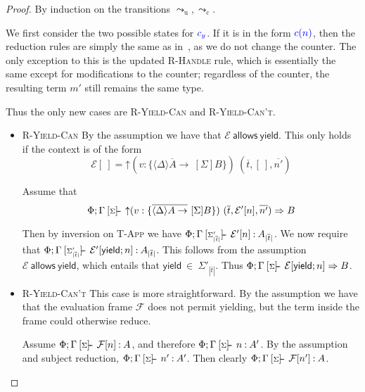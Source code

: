 \documentclass[msc,deptreport,cs]{infthesis} %
\newcommand{\counter}{{\color{blue}c_y}}
\newcommand{\justc}[1]{{\color{blue} c({#1})}}
\newcommand\allows{\textsf{allows}\xspace}
\newcommand\Cse{\textbf{Case}}
\newcommand{\many}{\overline}
\newcommand{\sigentails}[1]{\mathbin{[{\text{\scriptsize ${#1}$}}]\hspace{-0.4ex}\text{-\!-}}\,}
\newcommand{\inferbase}[5]{#1; #3 \mathbin{#2} {#4} \Rightarrow {#5}}
\newcommand{\checkbase}[5]{#1; #3 \mathbin{#2} #5 \mathbin{:} #4}
\newcommand{\makes}[5]{\inferbase{#1}{\sigentails{#3}}{#2}{#4}{#5}}
\newcommand{\has}[5]{\checkbase{#1}{\sigentails{#3}}{#2}{#4}{#5}}
\newcommand{\checksk}{\has{\kenv}}
\newcommand{\inferskgs}{\makes{\kenv}{\Gamma}{\sigs}}
\newcommand{\checkskgs}{\has{\kenv}{\Gamma}{\sigs}}
\newcommand{\adj}{\Delta}
\newcommand{\sigs}{\Sigma}
\newcommand{\thunk}[1]{\{{#1}\}}
\newcommand{\effin}[1]{\langle {#1} \rangle}
\newcommand{\effout}[1]{[{#1}]}
\newcommand{\EC}{\mathcal{E}}
\newcommand{\EF}{\mathcal{F}}
\newcommand{\cu}{\mathord{\uparrow}}
\newcommand{\redtou}{\leadsto_{\mathrm{u}}}
\newcommand{\redtoc}{\leadsto_{\mathrm{c}}}
\newcommand{\kenv}{\Phi}  %
\begin{document}
\begin{proof}
By induction on the transitions $\redtou, \redtoc$.

We first consider the two possible states for $\counter$. If it is in the form
$\justc{n}$, then the reduction rules are simply the same as
in~\cite{convent2020doo}, as we do not change the counter. The only exception to
this is the updated \textsc{R-Handle} rule, which is essentially the same except
for modifications to the counter; regardless of the counter, the resulting term
$m'$ still remains the same type.

Thus the only new cases are \textsc{R-Yield-Can} and \textsc{R-Yield-Can't}.

\begin{itemize}
\item[\Cse] \textsc{R-Yield-Can}
  By the assumption we have that $\EC~\allows~\textsf{yield}$. This only holds
  if the context is of the form
  \[\EC[~] = \cu (v : \thunk{\many{\effin{\adj} A
      \to}~\effout{\sigs}B})~(\many{t},[~],\many{n'})\]

  Assume that
  \[\inferskgs{\cu (v : \thunk{\many{\effin{\adj} A
      \to}~\effout{\sigs}B})~(\many{t},\EC'[n],\many{n'})}{B}\]

  Then by inversion on \textsc{T-App} we have
  $\checksk{\Gamma}{\sigs'_{|\many{t}|}}{A_{|\many{t}|}}{\EC'[n]}$. We now
  require that
  $\checksk{\Gamma}{\sigs'_{|\many{t}|}}{A_{|\many{t}|}}{\EC'[\textsf{yield};
      n]}$. This follows from the assumption $\EC~\allows~\textsf{yield}$, which
  entails that $\textsf{yield}~\in~\sigs'_{|\many{t}|}$. Thus
  $\inferskgs{\EC[\textsf{yield}; n]}{B}$.







\item[\Cse] \textsc{R-Yield-Can't}
  This case is more straightforward. By the assumption we have that the
  evaluation frame $\EF$ does not permit yielding, but the term inside the frame
  could otherwise reduce.

  Assume $\checkskgs{A}{\EF[n]}$, and therefore $\checkskgs{A'}{n}$. By the
  assumption and subject reduction, $\checkskgs{A'}{n'}$. Then clearly
  $\checkskgs{A}{\EF[n']}$.

\end{itemize}
\end{proof}
\end{document}
